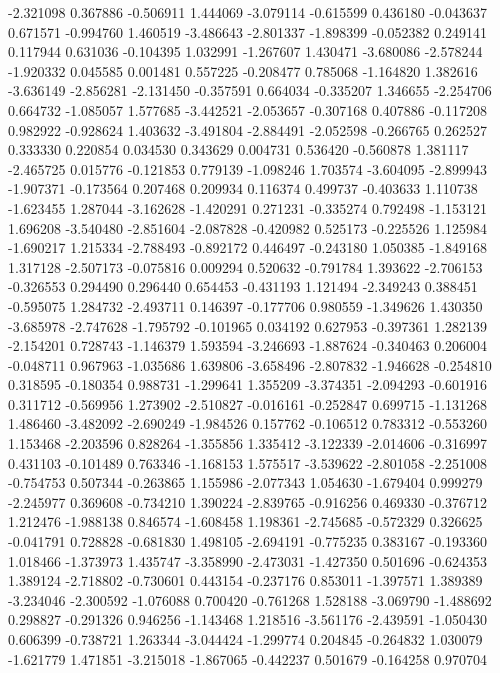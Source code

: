 -2.321098
0.367886
-0.506911
1.444069
-3.079114
-0.615599
0.436180
-0.043637
0.671571
-0.994760
1.460519
-3.486643
-2.801337
-1.898399
-0.052382
0.249141
0.117944
0.631036
-0.104395
1.032991
-1.267607
1.430471
-3.680086
-2.578244
-1.920332
0.045585
0.001481
0.557225
-0.208477
0.785068
-1.164820
1.382616
-3.636149
-2.856281
-2.131450
-0.357591
0.664034
-0.335207
1.346655
-2.254706
0.664732
-1.085057
1.577685
-3.442521
-2.053657
-0.307168
0.407886
-0.117208
0.982922
-0.928624
1.403632
-3.491804
-2.884491
-2.052598
-0.266765
0.262527
0.333330
0.220854
0.034530
0.343629
0.004731
0.536420
-0.560878
1.381117
-2.465725
0.015776
-0.121853
0.779139
-1.098246
1.703574
-3.604095
-2.899943
-1.907371
-0.173564
0.207468
0.209934
0.116374
0.499737
-0.403633
1.110738
-1.623455
1.287044
-3.162628
-1.420291
0.271231
-0.335274
0.792498
-1.153121
1.696208
-3.540480
-2.851604
-2.087828
-0.420982
0.525173
-0.225526
1.125984
-1.690217
1.215334
-2.788493
-0.892172
0.446497
-0.243180
1.050385
-1.849168
1.317128
-2.507173
-0.075816
0.009294
0.520632
-0.791784
1.393622
-2.706153
-0.326553
0.294490
0.296440
0.654453
-0.431193
1.121494
-2.349243
0.388451
-0.595075
1.284732
-2.493711
0.146397
-0.177706
0.980559
-1.349626
1.430350
-3.685978
-2.747628
-1.795792
-0.101965
0.034192
0.627953
-0.397361
1.282139
-2.154201
0.728743
-1.146379
1.593594
-3.246693
-1.887624
-0.340463
0.206004
-0.048711
0.967963
-1.035686
1.639806
-3.658496
-2.807832
-1.946628
-0.254810
0.318595
-0.180354
0.988731
-1.299641
1.355209
-3.374351
-2.094293
-0.601916
0.311712
-0.569956
1.273902
-2.510827
-0.016161
-0.252847
0.699715
-1.131268
1.486460
-3.482092
-2.690249
-1.984526
0.157762
-0.106512
0.783312
-0.553260
1.153468
-2.203596
0.828264
-1.355856
1.335412
-3.122339
-2.014606
-0.316997
0.431103
-0.101489
0.763346
-1.168153
1.575517
-3.539622
-2.801058
-2.251008
-0.754753
0.507344
-0.263865
1.155986
-2.077343
1.054630
-1.679404
0.999279
-2.245977
0.369608
-0.734210
1.390224
-2.839765
-0.916256
0.469330
-0.376712
1.212476
-1.988138
0.846574
-1.608458
1.198361
-2.745685
-0.572329
0.326625
-0.041791
0.728828
-0.681830
1.498105
-2.694191
-0.775235
0.383167
-0.193360
1.018466
-1.373973
1.435747
-3.358990
-2.473031
-1.427350
0.501696
-0.624353
1.389124
-2.718802
-0.730601
0.443154
-0.237176
0.853011
-1.397571
1.389389
-3.234046
-2.300592
-1.076088
0.700420
-0.761268
1.528188
-3.069790
-1.488692
0.298827
-0.291326
0.946256
-1.143468
1.218516
-3.561176
-2.439591
-1.050430
0.606399
-0.738721
1.263344
-3.044424
-1.299774
0.204845
-0.264832
1.030079
-1.621779
1.471851
-3.215018
-1.867065
-0.442237
0.501679
-0.164258
0.970704

